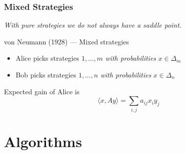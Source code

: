 \documentclass{beamer}
\begin{document}
\begin{frame}
  \frametitle{Mixed Strategies}
  \textit{With pure strategies we do not always have a saddle point.}

  \begin{block}{von Neumann (1928) --- Mixed strategies}
    \begin{itemize}
      \item Alice picks strategies $1, \dots, m$ \emph{with probabilities} $x\in \Delta_m$
      \item Bob picks strategies $1, \dots, n$ \emph{with probabilities} $x\in \Delta_n$
    \end{itemize}
    Expected gain of Alice is
    \begin{equation}
      \langle x, Ay \rangle = \sum_{i,j} a_{ij} x_i y_j
    \end{equation}
  \end{block}
\end{frame}

\section{Algorithms}%
\label{sec:}
\end{document}
